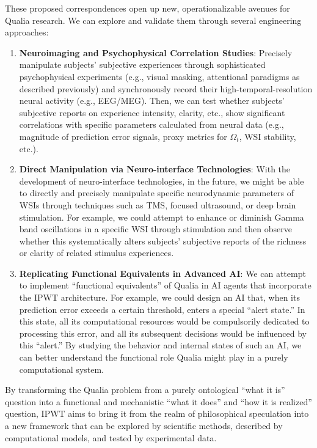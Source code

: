 \documentclass[
  a4paper]{article}
\providecommand{\tightlist}{%
  \setlength{\itemsep}{0pt}\setlength{\parskip}{0pt}}
\begin{document}
These proposed correspondences open up new, operationalizable avenues
for Qualia research. We can explore and validate them through several
engineering approaches:

\begin{enumerate}
\def\labelenumi{\arabic{enumi}.}
\tightlist
\item
  \textbf{Neuroimaging and Psychophysical Correlation Studies}:
  Precisely manipulate subjects' subjective experiences through
  sophisticated psychophysical experiments (e.g., visual masking,
  attentional paradigms as described previously) and synchronously
  record their high-temporal-resolution neural activity (e.g., EEG/MEG).
  Then, we can test whether subjects' subjective reports on experience
  intensity, clarity, etc., show significant correlations with specific
  parameters calculated from neural data (e.g., magnitude of prediction
  error signals, proxy metrics for \(\Omega_t\), WSI stability, etc.).
\item
  \textbf{Direct Manipulation via Neuro-interface Technologies}: With
  the development of neuro-interface technologies, in the future, we
  might be able to directly and precisely manipulate specific
  neurodynamic parameters of WSIs through techniques such as TMS,
  focused ultrasound, or deep brain stimulation. For example, we could
  attempt to enhance or diminish Gamma band oscillations in a specific
  WSI through stimulation and then observe whether this systematically
  alters subjects' subjective reports of the richness or clarity of
  related stimulus experiences.
\item
  \textbf{Replicating Functional Equivalents in Advanced AI}: We can
  attempt to implement ``functional equivalents'' of Qualia in AI agents
  that incorporate the IPWT architecture. For example, we could design
  an AI that, when its prediction error exceeds a certain threshold,
  enters a special ``alert state.'' In this state, all its computational
  resources would be compulsorily dedicated to processing this error,
  and all its subsequent decisions would be influenced by this
  ``alert.'' By studying the behavior and internal states of such an AI,
  we can better understand the functional role Qualia might play in a
  purely computational system.
\end{enumerate}

By transforming the Qualia problem from a purely ontological ``what it
is'' question into a functional and mechanistic ``what it does'' and
``how it is realized'' question, IPWT aims to bring it from the realm of
philosophical speculation into a new framework that can be explored by
scientific methods, described by computational models, and tested by
experimental data.
\end{document}
